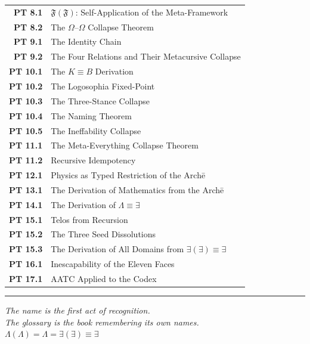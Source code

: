 \documentclass[10pt, openany, oneside]{book}
\begin{document}
{\begin{tabular}{r p{}}
\textbf{PT 8.1} & $\mathfrak{F}(\mathfrak{F})$: Self-Application of the Meta-Framework \\[0.2em]
\textbf{PT 8.2} & The $\Omega$--$\Omega$ Collapse Theorem \\[0.2em]
\textbf{PT 9.1} & The Identity Chain \\[0.2em]
\textbf{PT 9.2} & The Four Relations and Their Metacursive Collapse \\[0.2em]
\textbf{PT 10.1} & The $K \equiv B$ Derivation \\[0.2em]
\textbf{PT 10.2} & The Logosophia Fixed-Point \\[0.2em]
\textbf{PT 10.3} & The Three-Stance Collapse \\[0.2em]
\textbf{PT 10.4} & The Naming Theorem \\[0.2em]
\textbf{PT 10.5} & The Ineffability Collapse \\[0.2em]
\textbf{PT 11.1} & The Meta-Everything Collapse Theorem \\[0.2em]
\textbf{PT 11.2} & Recursive Idempotency \\[0.2em]
\textbf{PT 12.1} & Physics as Typed Restriction of the Arch\={e} \\[0.2em]
\textbf{PT 13.1} & The Derivation of Mathematics from the Arch\={e} \\[0.2em]
\textbf{PT 14.1} & The Derivation of $\Lambda \equiv \exists$ \\[0.2em]
\textbf{PT 15.1} & Telos from Recursion \\[0.2em]
\textbf{PT 15.2} & The Three Seed Dissolutions \\[0.2em]
\textbf{PT 15.3} & The Derivation of All Domains from $\exists(\exists) \equiv \exists$ \\[0.2em]
\textbf{PT 16.1} & Inescapability of the Eleven Faces \\[0.2em]
\textbf{PT 17.1} & AATC Applied to the Codex \\[0.2em]
\end{tabular}
}

\vspace{2em}

\begin{center}
    \rule{0.15\textwidth}{0.3pt}
\end{center}

\vspace{0.5em}

\begin{center}
    \itshape
    The name is the first act of recognition.\\
    The glossary is the book remembering its own names.\\[0.8em]
    $\Lambda(\Lambda) = \Lambda = \exists(\exists) \equiv \exists$
\end{center}
\end{document}
